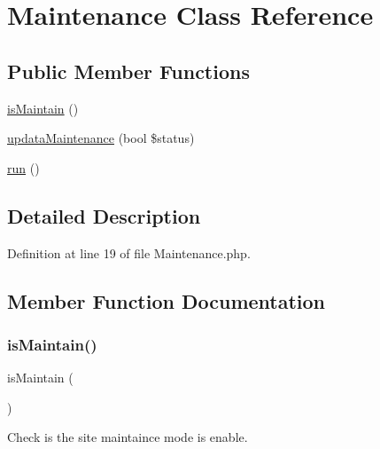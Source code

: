 \hypertarget{class_zest_1_1_common_1_1_maintenance}{}\section{Maintenance Class Reference}
\label{class_zest_1_1_common_1_1_maintenance}
\subsection*{Public Member Functions}
\begin{DoxyCompactItemize}
\item 
\mbox{\hyperlink{class_zest_1_1_common_1_1_maintenance_afbd4373867714c1dd5118123805bfc75}{is\+Maintain}} ()
\item 
\mbox{\hyperlink{class_zest_1_1_common_1_1_maintenance_aa25742bbd32a677faffc95f3d7ccaf35}{updata\+Maintenance}} (bool \$status)
\item 
\mbox{\hyperlink{class_zest_1_1_common_1_1_maintenance_afb0fafe7e02a3ae1993c01c19fad2bae}{run}} ()
\end{DoxyCompactItemize}


\subsection{Detailed Description}


Definition at line 19 of file Maintenance.\+php.



\subsection{Member Function Documentation}
\mbox{\label{class_zest_1_1_common_1_1_maintenance_afbd4373867714c1dd5118123805bfc75}} 
\subsubsection{\texorpdfstring{is\+Maintain()}{isMaintain()}}
{\footnotesize\ttfamily is\+Maintain (\begin{DoxyParamCaption}{ }\end{DoxyParamCaption})}

Check is the site maintaince mode is enable.

